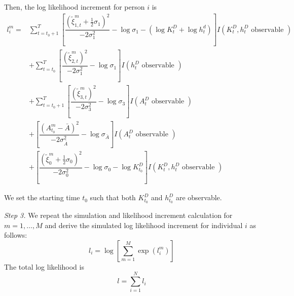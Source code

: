 \documentclass{article}
\begin{document}
Then, the log likelihood increment for person $i$ is
           \begin{equation*}
             \begin{split}
               l_i^m = & \sum_{t=t_0+1}^T \left[ \dfrac{(\tilde{\xi}_{1,t}^m+\frac{1}{2}\sigma_1)^2}{-2\sigma_1^2} - \log \sigma_1 - (\log K_t^D + \log h_t^d) \right] I(K_t^D, h_t^D \text{ observable }) \\
                       & + \sum_{t=t_0}^T \left[  \dfrac{(\tilde{\xi}_{2,t}^m)^2}{-2\sigma_1^2} - \log \sigma_1 \right] I(h_t^D \text{ observable }) \\
                       & + \sum_{t=t_0+1}^T \left[  \dfrac{(\tilde{\xi}_{3,t}^m)^2}{-2\sigma_3^2} - \log \sigma_3 \right] I(A_t^D \text{ observable }) \\
                       & + \left[ \dfrac{(A_{t_0}^m - \bar{A})^2}{-2 \sigma_{\bar{A}}^2} - \log \sigma_{\bar{A}} \right] I(A_t^D \text{ observable }) \\
               & + \left[ \dfrac{ ( \tilde{\xi}_0^m + \frac{1}{2} \sigma_0)^2}{-2 \sigma_0^2} - \log \sigma_0 - \log K_{t_0}^D \right] I(K_t^D, h_t^D \text{ observable })
        \end{split}
      \end{equation*} \par
      We set the starting time $t_0$ such that both $K_{t_0}^D$ and $h_{t_0}^D$ are observable. \par
      \noindent \textit{Step 3.}     We repeat the simulation and likelihood increment calculation for $m = 1, \dots , M$ and derive the simulated log likelihood increment for individual $i$ as follows:
      $$l_i = \log \left[ \sum_{m=1}^M \exp (l_i^m)\right]$$
  The total log likelihood is
  $$l = \sum_{i=1}^N l_i$$
      
  
\end{document}
